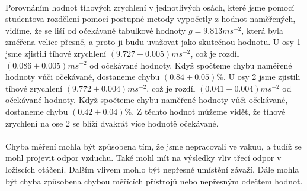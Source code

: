 \documentclass{praktikum}
\begin{document}
\paragraph{}
Porovnáním hodnot tíhových zrychlení v jednotlivých osách, které jsme pomocí studentova rozdělení pomocí postupné metody vypočetly z hodnot naměřených, vidíme, že se liší od očekávané tabulkové hodnoty $g=9.813ms^{-2}$, která byla změřena velice přesně, a proto ji budu uvažovat jako skutečnou hodnotu. U osy 1 jsme zjistili tíhové zrychlení $(9.727 \pm 0.005) ms^{-2}$, což je rozdíl $(0.086 \pm 0.005)ms^{-2}$ od očekávané hodnoty. Když spočteme chybu naměřené hodnoty vůči očekávané, dostaneme chybu $(0.84 \pm 0.05)\% $. U osy 2 jsme zjistili tíhové zrychlení $(9.772 \pm 0.004) ms^{-2}$, což je rozdíl $(0.041 \pm 0.004)ms^{-2}$  od očekávané hodnoty. Když spočteme chybu naměřené hodnoty vůči očekávané, dostaneme chybu $(0.42 \pm 0.04)\% $. Z těchto hodnot můžeme vidět, že tíhové zrychlení na ose 2 se blíží dvakrát více hodnotě očekávané. \\ \paragraph{}
Chyba měření mohla být způsobena tím, že jsme nepracovali ve vakuu, a tudíž se mohl projevit odpor vzduchu. Také mohl mít na výsledky vliv třecí odpor v ložiscích otáčení. Dalším vlivem mohlo být nepřesné umístění závaží. Dále mohla být chyba způsobena chybou měřících přístrojů nebo nepřesným odečtem hodnot.
\end{document}

